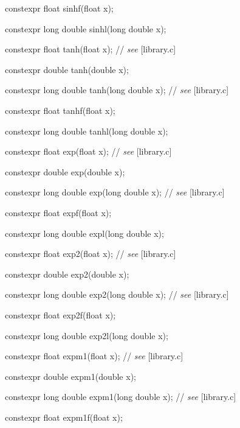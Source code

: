 \documentclass[prd,twocolumn,amsmath,amssymb,nofootinbib,eqsecnum]{revtex4-1}
\newcommand{\highlight}[1]{{\color{green} #1}}
\newcommand{\stdcomment}[1]{{// {\it see} [#1]}}
\begin{document}
{\highlight{constexpr} float sinhf(float x);

\highlight{constexpr} long double sinhl(long double x);

\vspace{2ex}


\highlight{constexpr} float tanh(float x); \stdcomment{library.c}

\highlight{constexpr} double tanh(double x);

\highlight{constexpr} long double tanh(long double x); \stdcomment{library.c}

\highlight{constexpr} float tanhf(float x);

\highlight{constexpr} long double tanhl(long double x);

\vspace{2ex}


\highlight{constexpr} float exp(float x); \stdcomment{library.c}

\highlight{constexpr} double exp(double x);

\highlight{constexpr} long double exp(long double x); \stdcomment{library.c}

\highlight{constexpr} float expf(float x);

\highlight{constexpr} long double expl(long double x);

\vspace{2ex}


\highlight{constexpr} float exp2(float x); \stdcomment{library.c}

\highlight{constexpr} double exp2(double x);

\highlight{constexpr} long double exp2(long double x); \stdcomment{library.c}

\highlight{constexpr} float exp2f(float x);

\highlight{constexpr} long double exp2l(long double x);

\vspace{2ex}


\highlight{constexpr} float expm1(float x); \stdcomment{library.c}

\highlight{constexpr} double expm1(double x);

\highlight{constexpr} long double expm1(long double x); \stdcomment{library.c}

\highlight{constexpr} float expm1f(float x);

}
\end{document}
